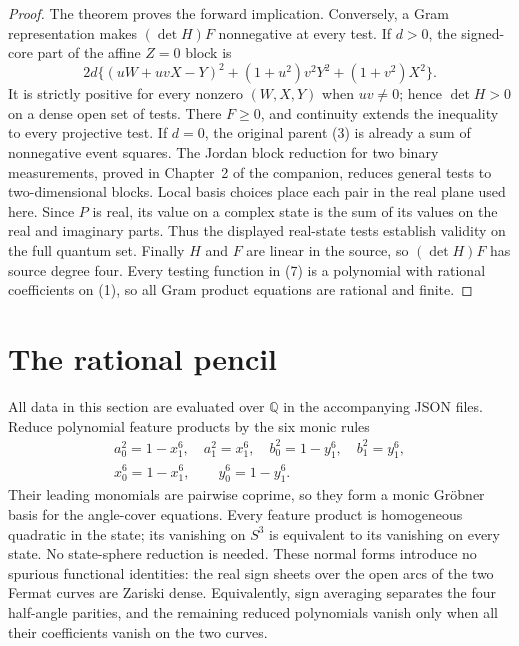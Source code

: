 \documentclass[11pt]{article}
\begin{document}
\begin{proof}
The theorem proves the forward implication.  Conversely, a Gram
representation makes $(\det H)F$ nonnegative at every test.  If $d>0$,
the signed-core part of the affine $Z=0$ block is
\[
 2d\{(uW+uvX-Y)^2+(1+u^2)v^2Y^2+(1+v^2)X^2\}.
\]
It is strictly positive for every nonzero $(W,X,Y)$ when $uv\ne0$;
hence $\det H>0$ on a dense open set of tests.  There $F\geq0$, and
continuity extends the inequality to every projective test.  If $d=0$,
the original parent (3) is already a sum of nonnegative event squares.
The Jordan block reduction for two binary measurements, proved in
Chapter~2 of the companion, reduces general tests to two-dimensional
blocks.  Local basis choices place each pair in the real plane used
here.  Since $P$ is real, its value on a complex state is the sum of
its values on the real and imaginary parts.  Thus the displayed
real-state tests establish validity on the full quantum set.
Finally $H$ and $F$ are linear in the source, so $(\det H)F$ has source
degree four.  Every testing function in (7) is a polynomial with
rational coefficients on (1), so all Gram product equations are
rational and finite.
\end{proof}


\section{The rational pencil}

All data in this section are evaluated over $\mathbb Q$ in the accompanying
JSON files.  Reduce polynomial feature products by the six monic rules
\[
\begin{gathered}
a_0^2=1-x_1^6,\quad a_1^2=x_1^6,\quad
b_0^2=1-y_1^6,\quad b_1^2=y_1^6,\\
x_0^6=1-x_1^6,\qquad y_0^6=1-y_1^6.
\end{gathered}                                                    \tag{17}
\]
Their leading monomials are pairwise coprime, so they form a monic
Gr\"obner basis for the angle-cover equations.  Every feature product
is homogeneous quadratic in the state; its vanishing on $S^3$ is
equivalent to its vanishing on every state.  No state-sphere reduction
is needed.  These normal forms introduce no spurious functional
identities: the real sign sheets over the open arcs of the two Fermat
curves are Zariski dense.  Equivalently, sign averaging separates the
four half-angle parities, and the remaining reduced polynomials vanish
only when all their coefficients vanish on the two curves.
\end{document}
